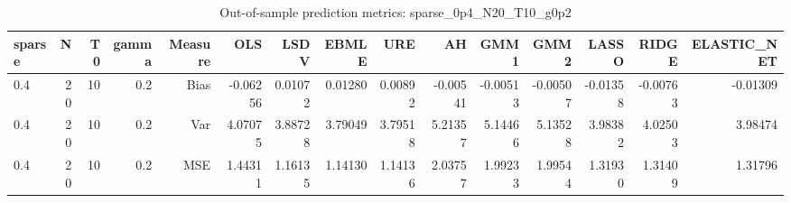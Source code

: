 \begin{table}[!htbp]\centering
\caption{Out-of-sample prediction metrics: sparse_0p4_N20_T10_g0p2}
\label{tab:table3_sparse_0p4_N20_T10_g0p2}
\begin{tabular}{lrrrrrrrrrrrrrr}
\hline
sparse & N & T0 & gamma & Measure & OLS & LSDV & EBMLE & URE & AH & GMM1 & GMM2 & LASSO & RIDGE & ELASTIC_NET \\
\hline
0.4 & 20 & 10 & 0.2 & Bias & -0.06256 & 0.01072 & 0.01280 & 0.00892 & -0.00541 & -0.00513 & -0.00507 & -0.01358 & -0.00763 & -0.01309 \\
0.4 & 20 & 10 & 0.2 & Var & 4.07075 & 3.88728 & 3.79049 & 3.79518 & 5.21357 & 5.14466 & 5.13528 & 3.98382 & 4.02503 & 3.98474 \\
0.4 & 20 & 10 & 0.2 & MSE & 1.44311 & 1.16135 & 1.14130 & 1.14136 & 2.03757 & 1.99233 & 1.99544 & 1.31930 & 1.31409 & 1.31796 \\
\hline
\end{tabular}
\end{table}

